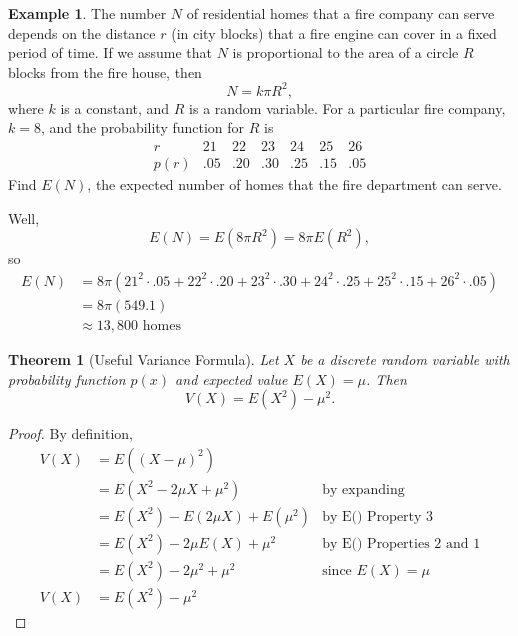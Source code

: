 \documentclass[
]{book}
\newtheorem{theorem}{Theorem}[chapter]
\theoremstyle{definition}
\theoremstyle{definition}
\newtheorem{example}{Example}[chapter]
\theoremstyle{definition}
\theoremstyle{definition}
\theoremstyle{remark}
\begin{document}
\begin{example}
\protect\hypertarget{exm:homes-near-firehouse}{}\label{exm:homes-near-firehouse}The number \(N\) of residential homes that a fire company can serve depends on the distance \(r\) (in city blocks) that a fire engine can cover in a fixed period of time. If we assume that \(N\) is proportional to the area of a circle \(R\) blocks from the fire house, then \[N = k \pi R^2,\] where \(k\) is a constant, and \(R\) is a random variable. For a particular fire company, \(k = 8\), and the probability function for \(R\) is
\[
\begin{array}{c|c|c|c|c|c|c|c}
r    &  21 &  22 &  23 &  24 & 25 & 26 \\ \hline
p(r) & .05 & .20 & .30 & .25 & .15 & .05
\end{array}
\]
Find \(E(N)\), the expected number of homes that the fire department can serve.

Well, \[E(N) = E(8\pi R^2) = 8\pi E(R^2),\]
so
\begin{align*}
E(N) &= 8\pi\left(21^2\cdot .05 + 22^2 \cdot .20 + 23^2 \cdot .30 + 24^2 \cdot .25 + 25^2 \cdot .15 + 26^2 \cdot .05\right) \\
&= 8\pi(549.1) \\
&\approx 13,800 \text{ homes}
\end{align*}
\end{example}

\begin{theorem}[Useful Variance Formula]
\protect\hypertarget{thm:variance-shortcut}{}\label{thm:variance-shortcut}Let \(X\) be a discrete random variable with probability function \(p(x)\) and expected value \(E(X) = \mu\). Then \[V(X) = E(X^2)-\mu^2.\]
\end{theorem}

\begin{proof}
By definition,
\begin{align*}
V(X) &= E((X-\mu)^2)\\
     &= E(X^2 - 2\mu X + \mu^2) &\text{by expanding}\\
     &= E(X^2) - E(2\mu X) + E(\mu^2) &\text{by E() Property 3} \\ 
     &= E(X^2) - 2\mu E(X) + \mu^2 &\text{by E() Properties 2 and 1}\\
     &= E(X^2) - 2\mu^2 + \mu^2 & \text{since }E(X)=\mu \\
V(X) &= E(X^2) - \mu^2
\end{align*}
\end{proof}
\end{document}
